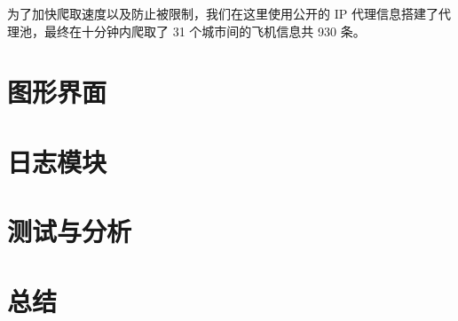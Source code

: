 \documentclass[lang=cn,blue]{elegantbook}
\begin{document}
为了加快爬取速度以及防止被限制，我们在这里使用公开的 IP 代理信息搭建了代理池，最终在十分钟内爬取了 31 个城市间的飞机信息共 930 条。
\chapter{图形界面}

\chapter{日志模块}

\chapter{测试与分析}

\chapter{总结}
\end{document}

